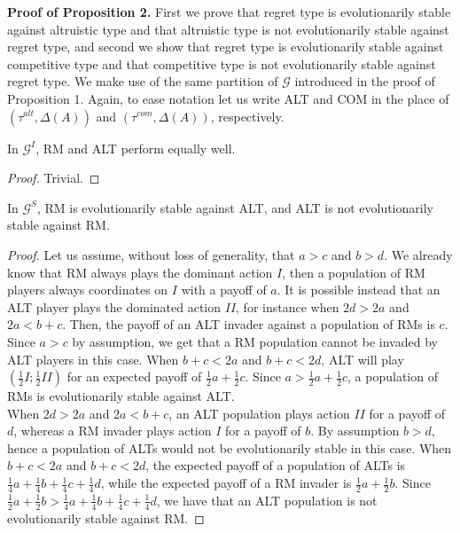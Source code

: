 \documentclass[fleqn,reqno,11pt]{article}
\begin{document}
\newpage

\textbf{Proof of Proposition 2.} First we prove that regret type is evolutionarily stable against altruistic type and that altruistic type is not evolutionarily stable against regret type, and second we show that regret type is evolutionarily stable against competitive type and that competitive type is not evolutionarily stable against regret type. We make use of the same partition of $\mathcal{G}$ introduced in the proof of Proposition 1. Again, to ease notation let us write ALT and COM in the place of $(\tau^{alt}, \Delta(A))$ and $(\tau^{com}, \Delta(A))$, respectively.

\begin{lemma}
In $\mathcal{G}^I$, RM and ALT perform equally well.
\end{lemma}

\begin{proof}
Trivial.
\end{proof}

\begin{lemma}
In $\mathcal{G}^S$, RM is evolutionarily stable against ALT, and ALT is not evolutionarily stable against RM. 
\end{lemma}

\begin{proof}
Let us assume, without loss of generality, that $a>c$ and $b>d$. We already know that RM always plays the dominant action $I$, then a population of RM players always coordinates on $I$ with a payoff of $a$. It is possible instead that an ALT player plays the dominated action $II$, for instance when $2d > 2a$ and $2a < b+c$. Then, the payoff of an ALT invader against a population of RMs is $c$. Since $a>c$ by assumption, we get that a RM population cannot be invaded by ALT players in this case. When $b+c < 2a$ and $b+c < 2d$, ALT will play $(\frac{1}{2}I;\frac{1}{2}II)$ for an expected payoff of $\frac{1}{2} a + \frac{1}{2} c$. Since $a > \frac{1}{2} a + \frac{1}{2} c$, a population of RMs is evolutionarily stable against ALT. \\
When $2d > 2a$ and $2a < b+c$, an ALT population plays action $II$ for a payoff of $d$, whereas a RM invader plays action $I$ for a payoff of $b$. By assumption $b>d$, hence a population of ALTs would not be evolutionarily stable in this case. When $b+c < 2a$ and $b+c < 2d$, the expected payoff of a population of ALTs is $\frac{1}{4}a+\frac{1}{4}b+\frac{1}{4}c+\frac{1}{4}d$, while the expected payoff of a RM invader is $\frac{1}{2}a+\frac{1}{2}b$. Since $\frac{1}{2}a+\frac{1}{2}b > \frac{1}{4}a+\frac{1}{4}b+\frac{1}{4}c+\frac{1}{4}d$, we have that an ALT population is not evolutionarily stable against RM.
\end{proof}
\end{document}

